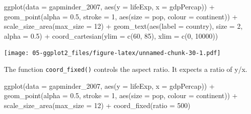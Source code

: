 \documentclass[
]{book}
\newenvironment{Shaded}{\begin{snugshade}}{\end{snugshade}}
\newcommand{\AttributeTok}[1]{\textcolor[rgb]{0.77,0.63,0.00}{#1}}
\newcommand{\DecValTok}[1]{\textcolor[rgb]{0.00,0.00,0.81}{#1}}
\newcommand{\FloatTok}[1]{\textcolor[rgb]{0.00,0.00,0.81}{#1}}
\newcommand{\FunctionTok}[1]{\textcolor[rgb]{0.00,0.00,0.00}{#1}}
\newcommand{\NormalTok}[1]{#1}
\newcommand{\SpecialCharTok}[1]{\textcolor[rgb]{0.00,0.00,0.00}{#1}}
\begin{document}
\begin{Shaded}
\begin{Highlighting}[]
\FunctionTok{ggplot}\NormalTok{(}\AttributeTok{data =}\NormalTok{ gapminder\_2007, }\FunctionTok{aes}\NormalTok{(}\AttributeTok{y =}\NormalTok{ lifeExp, }\AttributeTok{x =}\NormalTok{ gdpPercap)) }\SpecialCharTok{+} 
  \FunctionTok{geom\_point}\NormalTok{(}\AttributeTok{alpha =} \FloatTok{0.5}\NormalTok{, }\AttributeTok{stroke =} \DecValTok{1}\NormalTok{, }\FunctionTok{aes}\NormalTok{(}\AttributeTok{size =}\NormalTok{ pop, }\AttributeTok{colour =}\NormalTok{ continent)) }\SpecialCharTok{+}
  \FunctionTok{scale\_size\_area}\NormalTok{(}\AttributeTok{max\_size =} \DecValTok{12}\NormalTok{) }\SpecialCharTok{+}
  \FunctionTok{geom\_text}\NormalTok{(}\FunctionTok{aes}\NormalTok{(}\AttributeTok{label =}\NormalTok{ country), }\AttributeTok{size =} \DecValTok{2}\NormalTok{, }\AttributeTok{alpha =} \FloatTok{0.5}\NormalTok{) }\SpecialCharTok{+}
  \FunctionTok{coord\_cartesian}\NormalTok{(}\AttributeTok{ylim =} \FunctionTok{c}\NormalTok{(}\DecValTok{60}\NormalTok{, }\DecValTok{85}\NormalTok{), }\AttributeTok{xlim =} \FunctionTok{c}\NormalTok{(}\DecValTok{0}\NormalTok{, }\DecValTok{10000}\NormalTok{))}
\end{Highlighting}
\end{Shaded}

\texttt{[image: 05-ggplot2\_files/figure-latex/unnamed-chunk-30-1.pdf]}

The function \texttt{coord\_fixed()} controls the aspect ratio. It expects a ratio of y/x.

\begin{Shaded}
\begin{Highlighting}[]
\FunctionTok{ggplot}\NormalTok{(}\AttributeTok{data =}\NormalTok{ gapminder\_2007, }\FunctionTok{aes}\NormalTok{(}\AttributeTok{y =}\NormalTok{ lifeExp, }\AttributeTok{x =}\NormalTok{ gdpPercap)) }\SpecialCharTok{+} 
  \FunctionTok{geom\_point}\NormalTok{(}\AttributeTok{alpha =} \FloatTok{0.5}\NormalTok{, }\AttributeTok{stroke =} \DecValTok{1}\NormalTok{, }\FunctionTok{aes}\NormalTok{(}\AttributeTok{size =}\NormalTok{ pop, }\AttributeTok{colour =}\NormalTok{ continent)) }\SpecialCharTok{+}
  \FunctionTok{scale\_size\_area}\NormalTok{(}\AttributeTok{max\_size =} \DecValTok{12}\NormalTok{) }\SpecialCharTok{+}
  \FunctionTok{coord\_fixed}\NormalTok{(}\AttributeTok{ratio =} \DecValTok{500}\NormalTok{)}
\end{Highlighting}
\end{Shaded}
\end{document}
